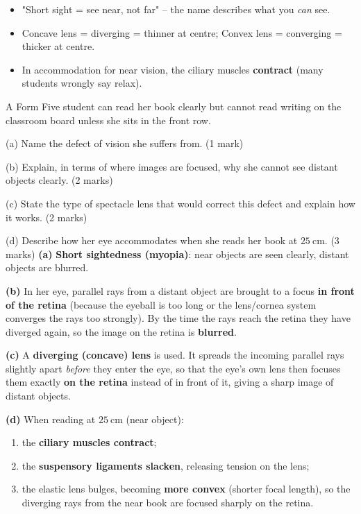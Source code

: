 \documentclass[11pt]{article}
\begin{document}
\begin{attention}
\begin{itemize}
\item "Short sight = see near, not far" -- the name describes what you \emph{can} see.
\item Concave lens = diverging = thinner at centre; Convex lens = converging = thicker at centre.
\item In accommodation for near vision, the ciliary muscles \textbf{contract} (many students wrongly say relax).
\end{itemize}
\end{attention}

\begin{exoresolu}
A Form Five student can read her book clearly but cannot read writing on the classroom board unless she sits in the front row.\par
(a) Name the defect of vision she suffers from. \hfill (1 mark)\par
(b) Explain, in terms of where images are focused, why she cannot see distant objects clearly. \hfill (2 marks)\par
(c) State the type of spectacle lens that would correct this defect and explain how it works. \hfill (2 marks)\par
(d) Describe how her eye accommodates when she reads her book at $25\ \mathrm{cm}$. \hfill (3 marks)
\tcblower
\textbf{(a)} \textbf{Short sightedness (myopia)}: near objects are seen clearly, distant objects are blurred.\par
\textbf{(b)} In her eye, parallel rays from a distant object are brought to a focus \textbf{in front of the retina} (because the eyeball is too long or the lens/cornea system converges the rays too strongly). By the time the rays reach the retina they have diverged again, so the image on the retina is \textbf{blurred}.\par
\textbf{(c)} A \textbf{diverging (concave) lens} is used. It spreads the incoming parallel rays slightly apart \emph{before} they enter the eye, so that the eye's own lens then focuses them exactly \textbf{on the retina} instead of in front of it, giving a sharp image of distant objects.\par
\textbf{(d)} When reading at $25\ \mathrm{cm}$ (near object):
\begin{enumerate}
\item the \textbf{ciliary muscles contract};
\item the \textbf{suspensory ligaments slacken}, releasing tension on the lens;
\item the elastic lens bulges, becoming \textbf{more convex} (shorter focal length), so the diverging rays from the near book are focused sharply on the retina.
\end{enumerate}
\end{exoresolu}
\end{document}
